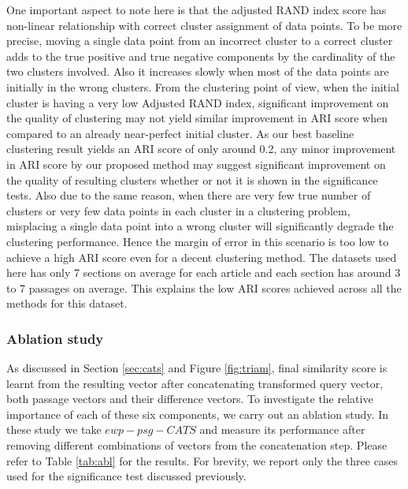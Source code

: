One important aspect to note here is that the adjusted RAND index score has non-linear relationship with correct cluster assignment of data points. To be more precise, moving a single data point from an incorrect cluster to a correct cluster adds to the true positive and true negative components by the cardinality of the two clusters involved.  Also it increases slowly when most of the data points are initially in the wrong clusters. From the clustering point of view, when the initial cluster is having a very low Adjusted RAND index, significant improvement on the quality of clustering may not yield similar improvement in ARI score when compared to an already near-perfect initial cluster. As our best baseline clustering result yields an ARI score of only around 0.2, any minor improvement in ARI score by our proposed method may suggest significant improvement on the quality of resulting clusters whether or not it is shown in the significance tests. Also due to the same reason, when there are very few true number of clusters or very few data points in each cluster in a clustering problem, misplacing a single data point into a wrong cluster will significantly degrade the clustering performance. Hence the margin of error in this scenario is too low to achieve a high ARI score even for a decent clustering method. The datasets used here has only 7 sections on average for each article and each section has around 3 to 7 passages on average. This explains the low ARI scores achieved across all the methods for this dataset.

\subsubsection{Ablation study} As discussed in Section \ref{sec:cats} and Figure \ref{fig:triam}, final similarity score is learnt from the resulting vector after concatenating transformed query vector, both passage vectors and their difference vectors. To investigate the relative importance of each of these six components, we carry out an ablation study. In these study we take $ewp-psg-CATS$ and measure its performance after removing different combinations of vectors from the concatenation step. Please refer to Table \ref{tab:abl} for the results. For brevity, we report only the three cases used for the significance test discussed previously. 


